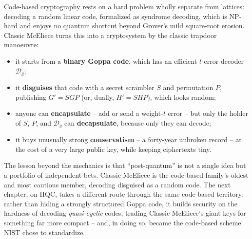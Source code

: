 Code-based cryptography rests on a hard problem wholly separate from lattices: decoding a random linear code, formalized as syndrome decoding, which is NP-hard and enjoys no quantum shortcut beyond Grover's mild square-root erosion. Classic McEliece turns this into a cryptosystem by the classic trapdoor manoeuvre:

\begin{itemize}
  \item it starts from a \textbf{binary Goppa code}, which has an efficient $t$-error decoder $\mathcal{D}_g$;
  \item it \textbf{disguises} that code with a secret scrambler $S$ and permutation $P$, publishing $G' = SGP$ (or, dually, $H' = SHP$), which looks random;
  \item anyone can \textbf{encapsulate} -- add or send a weight-$t$ error -- but only the holder of $S$, $P$, and $\mathcal{D}_g$ can \textbf{decapsulate}, because only they can decode;
  \item it buys unusually strong \textbf{conservatism} -- a forty-year unbroken record -- at the cost of a very large public key, while keeping ciphertexts tiny.
\end{itemize}

The lesson beyond the mechanics is that ``post-quantum'' is not a single idea but a portfolio of independent bets. Classic McEliece is the code-based family's oldest and most cautious member, decoding disguised as a random code. The next chapter, on HQC, takes a different route through the same code-based territory: rather than hiding a strongly structured Goppa code, it builds security on the hardness of decoding \emph{quasi-cyclic} codes, trading Classic McEliece's giant keys for something far more compact -- and, in doing so, became the code-based scheme NIST chose to standardize.
